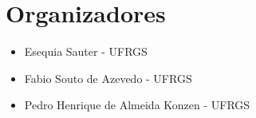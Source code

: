 
\chapter*{Organizadores}

\begin{itemize}
\item[] Esequia Sauter - UFRGS
\item[] Fabio Souto de Azevedo - UFRGS
\item[] Pedro Henrique de Almeida Konzen - UFRGS
\end{itemize}